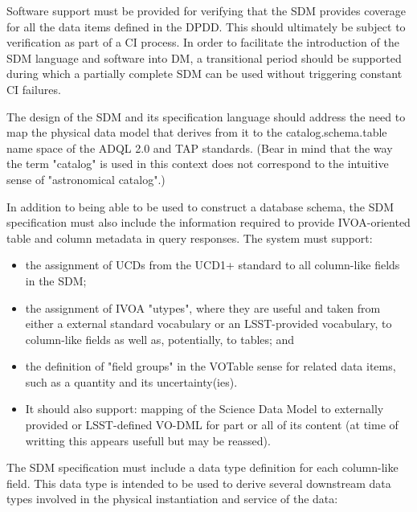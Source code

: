 Software support must be provided for verifying that the SDM provides coverage for all the data items defined in the DPDD.  This should ultimately be subject to verification as part of a CI process.  In order to facilitate the introduction of the SDM language and software into DM, a transitional period should be supported during which a partially complete SDM can be used without triggering constant CI failures.

The design of the SDM and its specification language should address the need to map the physical data model that derives from it to the catalog.schema.table name space of the ADQL 2.0 and TAP standards.  (Bear in mind that the way the term "catalog" is used in this context does not correspond to the intuitive sense of "astronomical catalog".)

In addition to being able to be used to construct a database schema, the SDM specification must also include the information required to provide IVOA-oriented table and column metadata in query responses.  The system must support:

\begin{itemize}
\item      the assignment of UCDs from the UCD1+ standard to all column-like fields in the SDM;
    \item the assignment of IVOA "utypes", where they are useful and taken from either a external standard vocabulary or an LSST-provided vocabulary, to column-like fields as well as, potentially, to tables; and
    \item the definition of "field groups" in the VOTable sense for related data items, such as a quantity and its uncertainty(ies).
\item It should also support:
    mapping of the Science Data Model to externally provided or LSST-defined VO-DML for part or all of its content (at time of writting this appears usefull but may be reassed).
\end{itemize}

The SDM specification must include a data type definition for each column-like field.  This data type is intended to be used to derive several downstream data types involved in the physical instantiation and service of the data:

